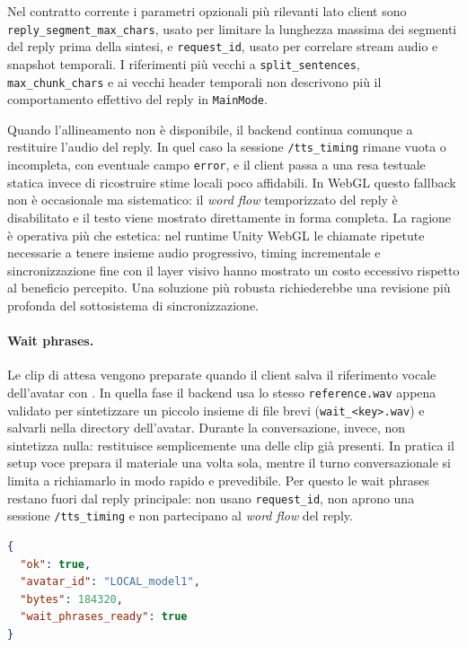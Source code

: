 Nel contratto corrente i parametri opzionali più rilevanti lato client sono \texttt{reply\_segment\_max\_chars}, usato per limitare la lunghezza massima dei segmenti del reply prima della sintesi, e \texttt{request\_id}, usato per correlare stream audio e snapshot temporali. I riferimenti più vecchi a \texttt{split\_sentences}, \texttt{max\_chunk\_chars} e ai vecchi header temporali non descrivono più il comportamento effettivo del reply in \texttt{MainMode}.

Quando l'allineamento non è disponibile, il backend continua comunque a restituire l'audio del reply. In quel caso la sessione \texttt{/tts\_timing} rimane vuota o incompleta, con eventuale campo \texttt{error}, e il client passa a una resa testuale statica invece di ricostruire stime locali poco affidabili. In WebGL questo fallback non è occasionale ma sistematico: il \emph{word flow} temporizzato del reply è disabilitato e il testo viene mostrato direttamente in forma completa. La ragione è operativa più che estetica: nel runtime Unity WebGL le chiamate ripetute necessarie a tenere insieme audio progressivo, timing incrementale e sincronizzazione fine con il layer visivo hanno mostrato un costo eccessivo rispetto al beneficio percepito. Una soluzione più robusta richiederebbe una revisione più profonda del sottosistema di sincronizzazione.

\paragraph{Wait phrases.}
Le clip di attesa vengono preparate quando il client salva il riferimento vocale dell'avatar con . In quella fase il backend usa lo stesso \texttt{reference.wav} appena validato per sintetizzare un piccolo insieme di file brevi (\texttt{wait\_<key>.wav}) e salvarli nella directory dell'avatar. Durante la conversazione, invece,  non sintetizza nulla: restituisce semplicemente una delle clip già presenti. In pratica il setup voce prepara il materiale una volta sola, mentre il turno conversazionale si limita a richiamarlo in modo rapido e prevedibile. Per questo le wait phrases restano fuori dal reply principale: non usano \texttt{request\_id}, non aprono una sessione \texttt{/tts\_timing} e non partecipano al \emph{word flow} del reply.

\begin{lstlisting}[language=json,caption={Risposta tipica di \texttt{/set\_avatar\_voice}.}]
{
  "ok": true,
  "avatar_id": "LOCAL_model1",
  "bytes": 184320,
  "wait_phrases_ready": true
}
\end{lstlisting}

